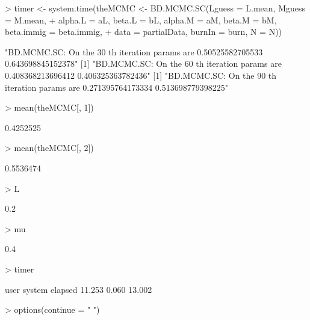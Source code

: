 \documentclass[12pt]{article}
\begin{document}
\begin{Schunk}
\begin{Sinput}
> timer <- system.time(theMCMC <- BD.MCMC.SC(Lguess = L.mean, Mguess = M.mean, 
+    alpha.L = aL, beta.L = bL, alpha.M = aM, beta.M = bM, beta.immig = beta.immig, 
+    data = partialData, burnIn = burn, N = N))
\end{Sinput}
\begin{Soutput}
[1] "BD.MCMC.SC: On the  30 th iteration params are  0.50525582705533 0.643698845152378"
[1] "BD.MCMC.SC: On the  60 th iteration params are  0.408368213696412 0.406325363782436"
[1] "BD.MCMC.SC: On the  90 th iteration params are  0.271395764173334 0.513698779398225"
\end{Soutput}
\begin{Sinput}
> mean(theMCMC[, 1])
\end{Sinput}
\begin{Soutput}
[1] 0.4252525
\end{Soutput}
\begin{Sinput}
> mean(theMCMC[, 2])
\end{Sinput}
\begin{Soutput}
[1] 0.5536474
\end{Soutput}
\begin{Sinput}
> L
\end{Sinput}
\begin{Soutput}
[1] 0.2
\end{Soutput}
\begin{Sinput}
> mu
\end{Sinput}
\begin{Soutput}
[1] 0.4
\end{Soutput}
\begin{Sinput}
> timer
\end{Sinput}
\begin{Soutput}
   user  system elapsed 
 11.253   0.060  13.002 
\end{Soutput}
\begin{Sinput}
> options(continue = " ")
\end{Sinput}
\end{Schunk}
\end{document}
